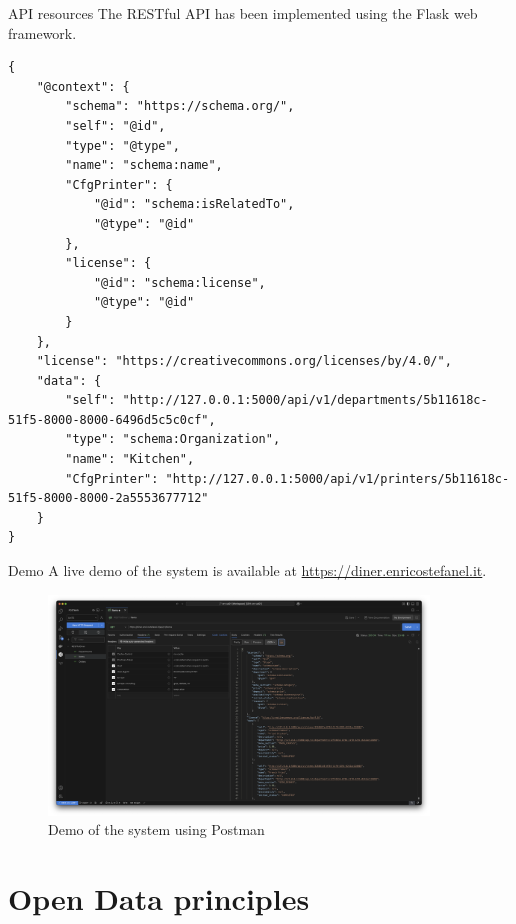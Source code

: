 \begin{frame}{API resources}
	The RESTful API has been implemented using the Flask web framework.

	

	\framebreak

	\vspace*{-1\baselineskip}
	\begin{lstlisting}
{
	"@context": {
		"schema": "https://schema.org/",
		"self": "@id",
		"type": "@type",
		"name": "schema:name",
		"CfgPrinter": {
			"@id": "schema:isRelatedTo",
			"@type": "@id"
		},
		"license": {
			"@id": "schema:license",
			"@type": "@id"
		}
	},
	"license": "https://creativecommons.org/licenses/by/4.0/",
	"data": {
		"self": "http://127.0.0.1:5000/api/v1/departments/5b11618c-51f5-8000-8000-6496d5c5c0cf",
		"type": "schema:Organization",
		"name": "Kitchen",
		"CfgPrinter": "http://127.0.0.1:5000/api/v1/printers/5b11618c-51f5-8000-8000-2a5553677712"
	}
}\end{lstlisting}

\end{frame}

\begin{frame}{Demo}
	A live demo of the system is available at \url{https://diner.enricostefanel.it}.

	\begin{figure}
		\centering
		\includegraphics[width=0.9\textwidth,height=0.6\textheight,keepaspectratio]{images/postman.png}
		\vspace*{-1\baselineskip}
		\caption{Demo of the system using Postman}
		\label{fig:demo}
	\end{figure}
\end{frame}


\section{Open Data principles}


